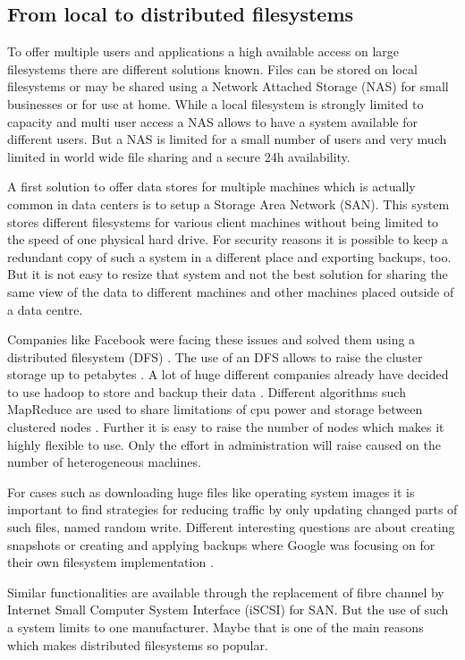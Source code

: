 \subsection{From local to distributed filesystems}

To offer multiple users and applications a high available access on large filesystems there are different solutions known. 
Files can be stored on local filesystems or may be shared using a Network Attached Storage (NAS) for small businesses or for use at home. While a local filesystem is strongly limited to capacity and multi user access a NAS allows to have a system available for different users. But a NAS is limited for a small number of users and very much limited in world wide file sharing and a secure 24h availability.

A first solution to offer data stores for multiple machines which is actually common in data centers is to setup a Storage Area Network (SAN). This system stores different filesystems for various client machines without being limited to the speed of one physical hard drive. For security reasons it is possible to keep a redundant copy of such a system in a different place and exporting backups, too. But it is not easy to resize that system and not the best solution for sharing the same view of the data to different machines and other machines placed outside of a data centre.

Companies like Facebook were facing these issues and solved them using a distributed filesystem (DFS) \cite{fb-hadoop}. The use of an DFS allows to raise the cluster storage  up to petabytes  \cite{fb-hadoop}. A lot of huge different companies already have decided to use hadoop to store and backup their data  \cite{hadoop-poweredby}. Different algorithms such MapReduce are used to share limitations of cpu power and storage between clustered nodes \cite{dean2008mapreduce}. Further it is easy to raise the number of nodes which makes it highly flexible to use. Only the effort in administration will raise caused on the number of heterogeneous machines.

For cases such as downloading huge files like operating system images it is important to find strategies for reducing traffic by only updating changed parts of such files, named random write. Different interesting questions are about creating snapshots or creating and applying backups where Google was focusing on for their own filesystem implementation \cite{ghemawat2003google}.

Similar functionalities are available through the replacement of fibre channel by  Internet Small Computer System Interface (iSCSI) for SAN. But the use of such a system limits to one manufacturer. Maybe that is one of the main reasons which makes distributed filesystems so popular.

